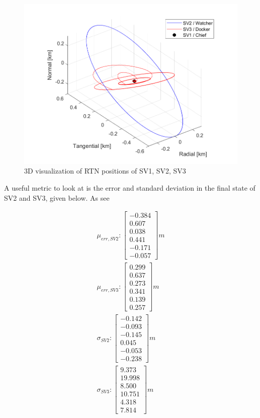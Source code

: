 \begin{figure}[H]
    \centering
    \includegraphics[width=0.7\linewidth]{sim/figures/PS9/ROE_3d_all_maneuvers.png}
    \caption{3D visualization of RTN positions of SV1, SV2, SV3}
    \label{fig:3d_visual_RTN_final_control}
\end{figure}

A useful metric to look at is the error and standard deviation in the final state of SV2 and SV3, given below. As see

\begin{align}
    \mu_{err, SV2}:
\begin{bmatrix} -0.384 \\ 0.607 \\ 0.038 \\ 0.441 \\ -0.171 \\ -0.057 \end{bmatrix} m\\
\mu_{err, SV3}:
\begin{bmatrix} 0.299 \\ 0.637 \\ 0.273 \\ 0.341 \\ 0.139 \\ 0.257 \end{bmatrix} m\\
\sigma_{SV2}:
\begin{bmatrix} -0.142 \\ -0.093 \\ -0.145 \\ 0.045 \\ -0.053 \\ -0.238 \end{bmatrix} m\\
\sigma_{SV3}:
\begin{bmatrix} 9.373 \\ 19.998 \\ 8.500 \\ 10.751 \\ 4.318 \\ 7.814 \end{bmatrix} m
\end{align}

